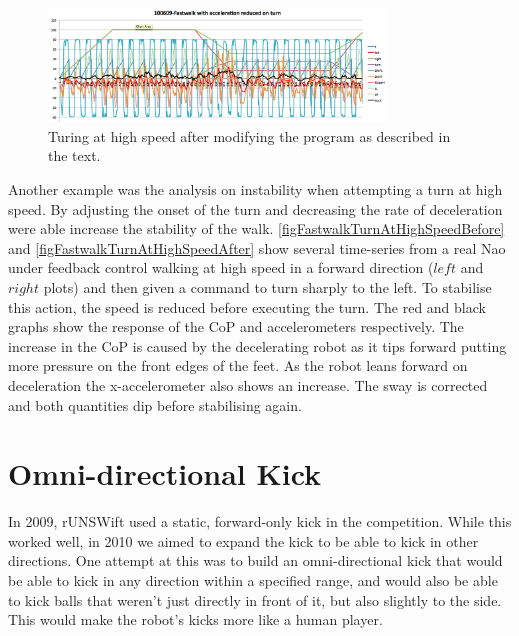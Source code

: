 \documentclass[pdftex,11pt,a4paper]{report}
\begin{document}
\begin{figure}[ht]
\centering
\includegraphics[width=0.8\textwidth]{figures/FastwalkTurnAtHighSpeedAfter}
\caption{Turing at high speed after modifying the program as described in the text.} \label{figFastwalkTurnAtHighSpeedAfter}
\end{figure} 

Another example was the analysis on instability when attempting a turn at high speed. By adjusting the onset of the turn and decreasing the rate of deceleration were able increase the stability of the walk. \autoref{figFastwalkTurnAtHighSpeedBefore} and \autoref{figFastwalkTurnAtHighSpeedAfter} show several time-series from a real Nao under feedback control walking at high speed in a forward direction ($left$ and $right$ plots) and then given a command to turn sharply to the left. To stabilise this action, the speed is reduced before executing the turn. The red and black graphs show the response of the CoP and accelerometers respectively. The increase in the CoP is caused by the decelerating robot as it tips forward putting more pressure on the front edges of the feet. As the robot leans forward on deceleration the x-accelerometer also shows an increase. The sway is corrected and both quantities dip before stabilising again.

\section{Omni-directional Kick}
In 2009, rUNSWift used a static, forward-only kick in the competition.
While this worked well, in 2010 we aimed to expand the kick to be able to
kick in other directions. One attempt at this was to build an
omni-directional kick that would be able to kick in any direction within a
specified range, and would also be able to kick balls that weren't just
directly in front of it, but also slightly to the side. This would make the
robot's kicks more like a human player.
\end{document}
